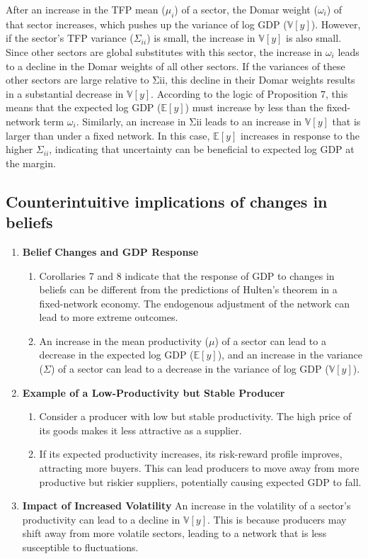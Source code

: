 \documentclass[11pt]{article}
\theoremstyle{definition}
\begin{document}
	After an increase in the TFP mean ($\mu_i$) of a sector, the Domar weight ($\omega_i$) of that sector increases, which pushes up the variance of log GDP ($\mathbb{V}[y]$). However, if the sector's TFP variance ($\Sigma_{ii}$) is small, the increase in $\mathbb{V}[y]$ is also small. Since other sectors are global substitutes with this sector, the increase in $\omega_i$ leads to a decline in the Domar weights of all other sectors. If the variances of these other sectors are large relative to Σii, this decline in their Domar weights results in a substantial decrease in $\mathbb{V}[y]$. According to the logic of Proposition 7, this means that the expected log GDP ($\mathbb{E}[y]$) must increase by less than the fixed-network term $\omega_i$. Similarly, an increase in Σii leads to an increase in $\mathbb{V}[y]$ that is larger than under a fixed network. In this case, $\mathbb{E}[y]$ increases in response to the higher $\Sigma_{ii}$, indicating that uncertainty can be beneficial to expected log GDP at the margin.
	
	\subsection*{Counterintuitive implications of changes in beliefs}
	\begin{enumerate}[leftmargin=1cm, label=\arabic*.]
		\item \textbf{Belief Changes and GDP Response}
		\begin{enumerate}[leftmargin=1cm]
			\item Corollaries 7 and 8 indicate that the response of GDP to changes in beliefs can be different from the predictions of Hulten’s theorem in a fixed-network economy. The endogenous adjustment of the network can lead to more extreme outcomes.
			\item An increase in the mean productivity ($\mu$) of a sector can lead to a decrease in the expected log GDP ($\mathbb{E}[y]$), and an increase in the variance ($\Sigma$) of a sector can lead to a decrease in the variance of log GDP ($\mathbb{V}[y]$).
		\end{enumerate} 
		\item \textbf{Example of a Low-Productivity but Stable Producer}
		\begin{enumerate}[leftmargin=1cm]
			\item Consider a producer with low but stable productivity. The high price of its goods makes it less attractive as a supplier.
			\item If its expected productivity increases, its risk-reward profile improves, attracting more buyers. This can lead producers to move away from more productive but riskier suppliers, potentially causing expected GDP to fall.
		\end{enumerate} 
		\item \textbf{Impact of Increased Volatility} An increase in the volatility of a sector’s productivity can lead to a decline in $\mathbb{V}[y]$. This is because producers may shift away from more volatile sectors, leading to a network that is less susceptible to fluctuations.
	\end{enumerate}
\end{document}
